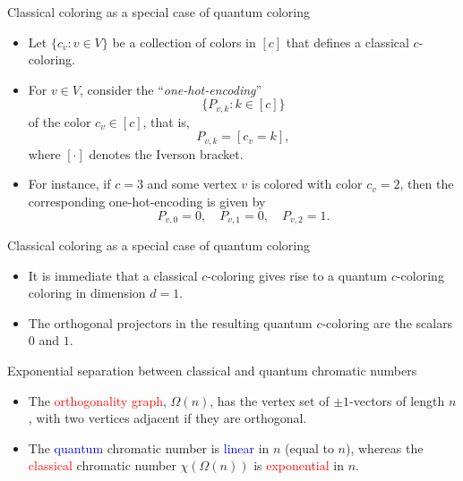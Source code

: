 \documentclass{beamer}
\renewcommand{\>}{\rangle}
\newcommand{\<}{\langle}
\begin{document}
%

\begin{frame}{Classical coloring as a special case of quantum coloring}

\begin{itemize}
\item Let $\{c_v : v\in V\}$ be a collection of colors in $[c]$ that defines a classical $c$-coloring.  

\item For $v\in V$, consider the ``\emph{one-hot-encoding}''
\[
\{P_{v,k} : k \in [c]\}
\] 
of the color $c_v\in [c]$, that is,
\[
P_{v,k} = [c_ v = k],
\]
where $[\cdot ]$ denotes the Iverson bracket.

\item For instance, if $c=3$ and some vertex $v$ is colored with color $c_v=2$, then the corresponding one-hot-encoding is given by
\[
P_{v,0}=0, \quad P_{v,1}=0, \quad P_{v,2}=1.
\]
\end{itemize}

\end{frame}

% 

\begin{frame}{Classical coloring as a special case of quantum coloring}
\begin{itemize}
\item It is immediate that a classical $c$-coloring gives rise to a quantum $c$-coloring coloring in dimension $d=1$. 

\item The orthogonal projectors in the resulting quantum $c$-coloring are the scalars $0$ and $1$.
\end{itemize}
\end{frame}

%

\begin{frame}{Exponential separation between classical and quantum chromatic numbers}
\begin{itemize}
\item The \textcolor{red}{orthogonality graph}, $\Omega(n)$, has the vertex set of $\pm 1$-vectors of length $n$, with two vertices adjacent if they are orthogonal.

\item The \textcolor{blue}{quantum} chromatic number is \textcolor{blue}{linear} in $n$ (equal to $n$), whereas the \textcolor{red}{classical} chromatic number $\chi(\Omega(n))$ is \textcolor{red}{exponential} in $n$.
\end{itemize}
\end{frame}
\end{document}
